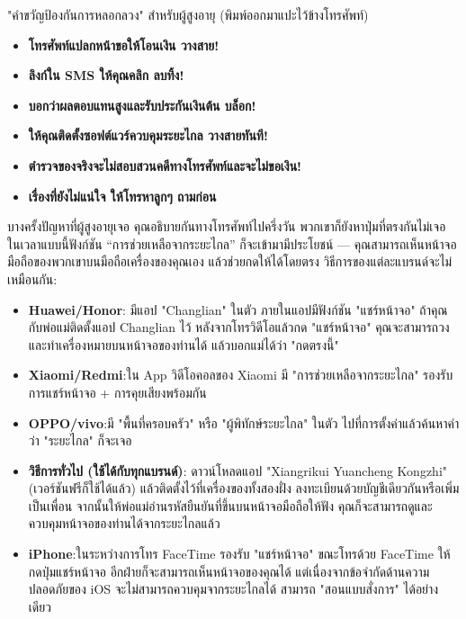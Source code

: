 \begin{tcbwarn}{"คำขวัญป้องกันการหลอกลวง" สำหรับผู้สูงอายุ (พิมพ์ออกมาแปะไว้ข้างโทรศัพท์)}
\begin{itemize}
  \item \textbf{โทรศัพท์แปลกหน้าขอให้โอนเงิน วางสาย!}
  \item \textbf{ลิงก์ใน SMS ให้คุณคลิก ลบทิ้ง!}
  \item \textbf{บอกว่าผลตอบแทนสูงและรับประกันเงินต้น บล็อก!}
  \item \textbf{ให้คุณติดตั้งซอฟต์แวร์ควบคุมระยะไกล วางสายทันที!}
  \item \textbf{ตำรวจของจริงจะไม่สอบสวนคดีทางโทรศัพท์และจะไม่ขอเงิน!}
  \item \textbf{เรื่องที่ยังไม่แน่ใจ ให้โทรหาลูกๆ ถามก่อน}
\end{itemize}

\end{tcbwarn}


บางครั้งปัญหาที่ผู้สูงอายุเจอ คุณอธิบายกันทางโทรศัพท์ไปครึ่งวัน พวกเขาก็ยังหาปุ่มที่ตรงกันไม่เจอ ในเวลาแบบนี้ฟังก์ชัน “การช่วยเหลือจากระยะไกล” ก็จะเข้ามามีประโยชน์ — คุณสามารถเห็นหน้าจอมือถือของพวกเขาบนมือถือเครื่องของคุณเอง แล้วช่วยกดให้ได้โดยตรง วิธีการของแต่ละแบรนด์จะไม่เหมือนกัน:

\begin{itemize}
  \item \textbf{Huawei/Honor}: มีแอป "Changlian" ในตัว ภายในแอปมีฟังก์ชัน "แชร์หน้าจอ" ถ้าคุณกับพ่อแม่ติดตั้งแอป Changlian ไว้ หลังจากโทรวิดีโอแล้วกด "แชร์หน้าจอ" คุณจะสามารถวงและทำเครื่องหมายบนหน้าจอของท่านได้ แล้วบอกแม่ได้ว่า "กดตรงนี้"
  \item \textbf{Xiaomi/Redmi}:ใน App วิดีโอคอลของ Xiaomi มี "การช่วยเหลือจากระยะไกล" รองรับการแชร์หน้าจอ + การคุยเสียงพร้อมกัน
  \item \textbf{OPPO/vivo}:มี "พื้นที่ครอบครัว" หรือ "ผู้พิทักษ์ระยะไกล" ในตัว ไปที่การตั้งค่าแล้วค้นหาคำว่า "ระยะไกล" ก็จะเจอ
  \item \textbf{วิธีการทั่วไป (ใช้ได้กับทุกแบรนด์)}: ดาวน์โหลดแอป "Xiangrikui Yuancheng Kongzhi" (เวอร์ชันฟรีก็ใช้ได้แล้ว) แล้วติดตั้งไว้ที่เครื่องของทั้งสองฝั่ง ลงทะเบียนด้วยบัญชีเดียวกันหรือเพิ่มเป็นเพื่อน จากนั้นให้พ่อแม่อ่านรหัสยืนยันที่ขึ้นบนหน้าจอมือถือให้ฟัง คุณก็จะสามารถดูและควบคุมหน้าจอของท่านได้จากระยะไกลแล้ว
  \item \textbf{iPhone}:ในระหว่างการโทร FaceTime รองรับ "แชร์หน้าจอ" ขณะโทรด้วย FaceTime ให้กดปุ่มแชร์หน้าจอ อีกฝ่ายก็จะสามารถเห็นหน้าจอของคุณได้ แต่เนื่องจากข้อจำกัดด้านความปลอดภัยของ iOS จะไม่สามารถควบคุมจากระยะไกลได้ สามารถ "สอนแบบสั่งการ" ได้อย่างเดียว
\end{itemize}

